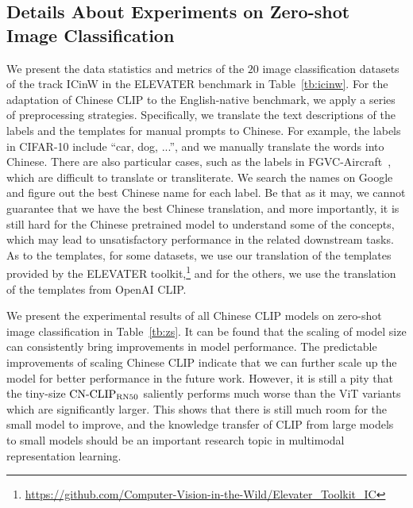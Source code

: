 

\subsection{Details About Experiments on Zero-shot Image Classification}





We present the data statistics and metrics of the $20$ image classification datasets of the track ICinW in the ELEVATER benchmark in Table~\ref{tb:icinw}. 
For the adaptation of Chinese CLIP to the English-native benchmark, we apply a series of preprocessing strategies. Specifically, we translate the text descriptions of the labels and the templates for manual prompts to Chinese. 
For example, the labels in CIFAR-10 include ``car, dog, ...'', and we manually translate the words into Chinese. 
There are also particular cases, such as the labels in FGVC-Aircraft~\citep{fgvc}, which are difficult to translate or transliterate. 
We search the names on Google and figure out the best Chinese name for each label. 
Be that as it may, we cannot guarantee that we have the best Chinese translation, and more importantly, it is still hard for the Chinese pretrained model to understand some of the concepts, which may lead to unsatisfactory performance in the related downstream tasks. 
As to the templates, for some datasets, we use our translation of the templates provided by the ELEVATER toolkit,\footnote{\url{https://github.com/Computer-Vision-in-the-Wild/Elevater\_Toolkit\_IC}} and for the others, we use the translation of the templates from OpenAI CLIP.

We present the experimental results of all Chinese CLIP models on zero-shot image classification in Table~\ref{tb:zs}. 
It can be found that the scaling of model size can consistently bring improvements in model performance. 
The predictable improvements of scaling Chinese CLIP indicate that we can further scale up the model for better performance in the future work.  
However, it is still a pity that the tiny-size $\text{CN-CLIP}\rm_{RN50}$ saliently performs much worse than the ViT variants which are significantly larger. 
This shows that there is still much room for the small model to improve, and the knowledge transfer of CLIP from large models to small models should be an important research topic in multimodal representation learning. 

